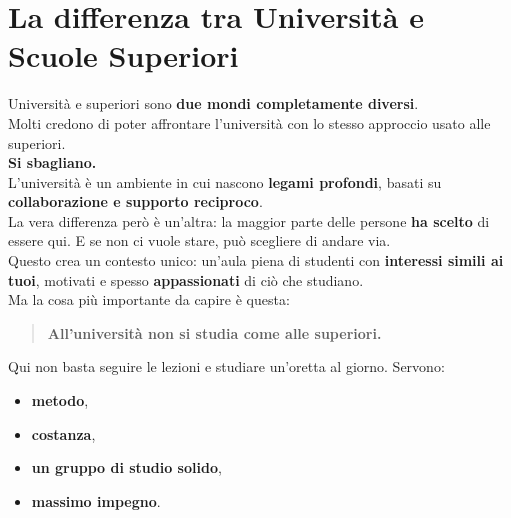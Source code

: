 \documentclass{article}
\begin{document}
\section{La differenza tra Università e Scuole Superiori}
Università e superiori sono \textbf{due mondi completamente diversi}.\\
Molti credono di poter affrontare l'università con lo stesso approccio usato alle superiori.\\
\textbf{Si sbagliano.}\\
L'università è un ambiente in cui nascono \textbf{legami profondi}, basati su \textbf{collaborazione e supporto reciproco}.\\
La vera differenza però è un'altra: la maggior parte delle persone \textbf{ha scelto} di essere qui. E se non ci vuole stare, può scegliere di andare via.\\
Questo crea un contesto unico: un'aula piena di studenti con \textbf{interessi simili ai tuoi}, motivati e spesso \textbf{appassionati} di ciò che studiano.\\
Ma la cosa più importante da capire è questa:
\begin{quote}
\textbf{All'università non si studia come alle superiori.}
\end{quote}%
Qui non basta seguire le lezioni e studiare un'oretta al giorno. Servono:
\begin{itemize}
\item \textbf{metodo},
\item \textbf{costanza},
\item \textbf{un gruppo di studio solido},
\item \textbf{massimo impegno}.
\end{itemize}
\end{document}
